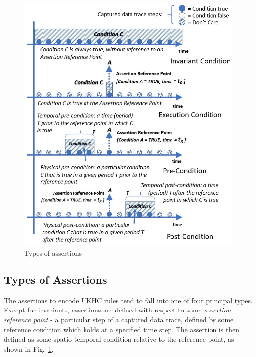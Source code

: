 \begin{figure}[!hb]
    \centering
    \includegraphics[width=0.98\linewidth]{../other/figures/Assertion_Categories_Figure.png}
    \caption{Types of assertions}
    \label{fig:categories_of_assertions}
\end{figure}


\subsection{Types of Assertions} \label{assertion_categories}

The assertions to encode UKHC rules tend to fall into one of four principal types. Except for invariants, assertions are defined with respect to some \emph{assertion reference point} - a particular step of a captured data trace, defined by some reference condition which holds at a specified time step. The assertion is then defined as some spatio-temporal condition relative to the reference point, as shown in Fig.~\ref{fig:categories_of_assertions}.


